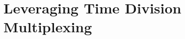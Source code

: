 \chapter{Leveraging Time Division Multiplexing}\label{sec:leveraging-time-division-multiplexing}
\parskip4pt \parindent12pt
